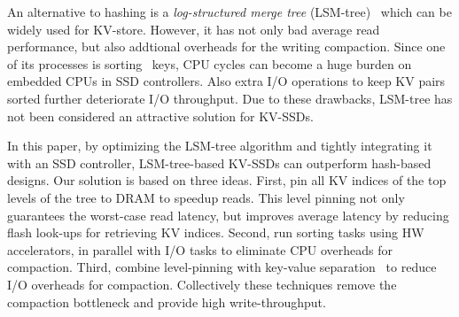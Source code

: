 \documentclass{abstract_hutech}
\begin{document}

An alternative to hashing is a \emph{log-structured merge tree} (LSM-tree)~\cite{lsm-tree} which can be widely used for KV-store.
However, it has not only bad average read performance, 
but also addtional overheads for the writing compaction.
Since one of its processes is sorting~\cite{wisckey} keys, 
CPU cycles can become a huge burden on embedded CPUs in SSD controllers. 
Also extra I/O operations to keep KV pairs sorted further deteriorate I/O throughput.  
Due to these drawbacks, LSM-tree has not been considered an attractive solution for KV-SSDs.

%
In this paper, by optimizing the LSM-tree algorithm and tightly integrating it with an SSD controller, LSM-tree-based KV-SSDs can outperform hash-based designs.  
Our solution is based on three ideas.
First, pin all KV indices of the top levels of the tree to DRAM to speedup reads.
This level pinning not only guarantees the worst-case read latency, but improves average latency by reducing flash look-ups for retrieving KV indices.  
Second, run sorting tasks using HW accelerators, in parallel with I/O tasks to eliminate CPU overheads for compaction.
Third, combine level-pinning with key-value separation~\cite{wisckey} to reduce I/O overheads for compaction.
Collectively these techniques remove the compaction bottleneck and provide high write-throughput.
\end{document}
